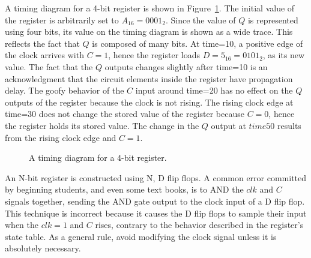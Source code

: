 A timing diagram for a 4-bit register is shown in Figure~\ref{fig:RegTime}.
The initial value of the register is arbitrarily set to $A_{16}=0001_2$.  
Since the value of $Q$ is represented using four bits, its value on the timing
diagram is shown as a wide trace.  This reflects the fact that $Q$ is 
composed of many bits.  At time=10, a positive edge of the clock arrives
with $C=1$, hence the register loads $D=5_{16}=0101_2$, as its new value.  
The fact that the $Q$ outputs changes slightly after time=10 is an 
acknowledgment that the circuit elements inside the register have 
propagation delay.  The goofy behavior of the $C$ input around time=20 has
no effect on the $Q$ outputs of the register because the clock is not rising.
The rising clock edge at time=30 does not change the stored value of the 
register because $C=0$, hence the register holds its stored value.  The change
in the $Q$ output at $time 50$ results from the rising clock edge and $C=1$.

\begin{figure}[ht]
\caption{A timing diagram for a 4-bit register.}
\label{fig:RegTime}
\end{figure}

An N-bit register is constructed using N, D flip flops.  A common error
committed by beginning students, and even some text books, is to AND the 
$clk$ and $C$ signals together, sending the AND gate output to the 
clock input of a D flip
flop.  This technique is incorrect because it causes the D flip flops to 
sample their input when the $clk = 1$ and $C$ rises, contrary to the behavior
described in the register's state table.  As a general rule, 
avoid modifying the clock signal unless it is absolutely necessary.

